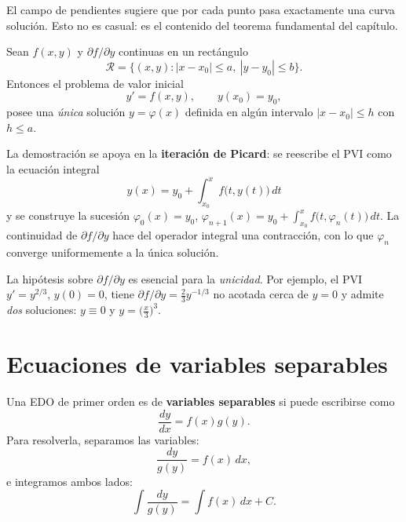 El campo de pendientes sugiere que por cada punto pasa exactamente una curva solución. Esto no es casual: es el contenido del teorema fundamental del capítulo.

\begin{theorem}\label{thm:cap27:existencia-unicidad}
Sean \(f(x,y)\) y \(\partial f/\partial y\) continuas en un rectángulo
\[
\mathcal{R}=\{(x,y):|x-x_0|\le a,\ |y-y_0|\le b\}.
\]
Entonces el problema de valor inicial
\[
y'=f(x,y),\qquad y(x_0)=y_0,
\]
posee una \emph{única} solución \(y=\varphi(x)\) definida en algún intervalo \(|x-x_0|\le h\) con \(h\le a\).
\end{theorem}

\begin{rem}
La demostración se apoya en la \textbf{iteración de Picard}: se reescribe el PVI como la ecuación integral
\[
y(x)=y_0+\int_{x_0}^{x} f\bigl(t,y(t)\bigr)\,dt
\]
y se construye la sucesión \(\varphi_0(x)=y_0\), \(\varphi_{n+1}(x)=y_0+\int_{x_0}^{x} f\bigl(t,\varphi_n(t)\bigr)\,dt\). La continuidad de \(\partial f/\partial y\) hace del operador integral una contracción, con lo que \(\varphi_n\) converge uniformemente a la única solución.

La hipótesis sobre \(\partial f/\partial y\) es esencial para la \emph{unicidad}. Por ejemplo, el PVI \(y'=y^{2/3}\), \(y(0)=0\), tiene \(\partial f/\partial y=\tfrac{2}{3}y^{-1/3}\) no acotada cerca de \(y=0\) y admite \emph{dos} soluciones: \(y\equiv 0\) y \(y=\bigl(\tfrac{x}{3}\bigr)^{3}\).
\end{rem}

\section{Ecuaciones de variables separables}

Una EDO de primer orden es de \textbf{variables separables} si puede escribirse como
\[
\frac{dy}{dx} = f(x)g(y).
\]
Para resolverla, separamos las variables:
\[
\frac{dy}{g(y)} = f(x)\,dx,
\]
e integramos ambos lados:
\[
\int \frac{dy}{g(y)} = \int f(x)\,dx + C.
\]

